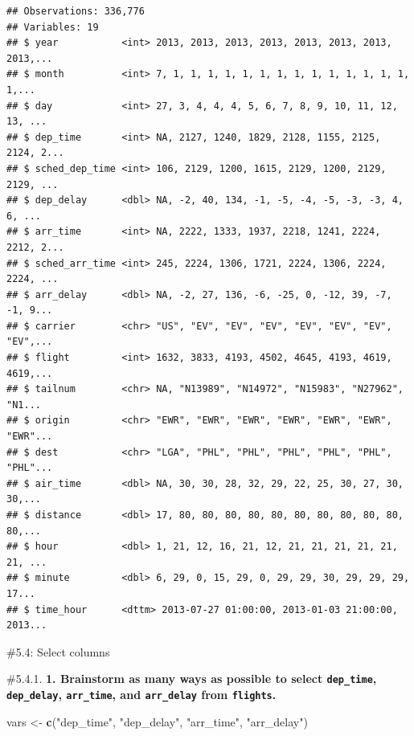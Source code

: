\documentclass[]{book}
\newenvironment{Shaded}{\begin{snugshade}}{\end{snugshade}}
\newcommand{\KeywordTok}[1]{\textcolor[rgb]{0.13,0.29,0.53}{\textbf{#1}}}
\newcommand{\NormalTok}[1]{#1}
\newcommand{\StringTok}[1]{\textcolor[rgb]{0.31,0.60,0.02}{#1}}
\theoremstyle{definition}
\theoremstyle{definition}
\theoremstyle{definition}
\theoremstyle{remark}
\begin{document}
\begin{verbatim}
## Observations: 336,776
## Variables: 19
## $ year           <int> 2013, 2013, 2013, 2013, 2013, 2013, 2013, 2013,...
## $ month          <int> 7, 1, 1, 1, 1, 1, 1, 1, 1, 1, 1, 1, 1, 1, 1, 1,...
## $ day            <int> 27, 3, 4, 4, 4, 5, 6, 7, 8, 9, 10, 11, 12, 13, ...
## $ dep_time       <int> NA, 2127, 1240, 1829, 2128, 1155, 2125, 2124, 2...
## $ sched_dep_time <int> 106, 2129, 1200, 1615, 2129, 1200, 2129, 2129, ...
## $ dep_delay      <dbl> NA, -2, 40, 134, -1, -5, -4, -5, -3, -3, 4, 6, ...
## $ arr_time       <int> NA, 2222, 1333, 1937, 2218, 1241, 2224, 2212, 2...
## $ sched_arr_time <int> 245, 2224, 1306, 1721, 2224, 1306, 2224, 2224, ...
## $ arr_delay      <dbl> NA, -2, 27, 136, -6, -25, 0, -12, 39, -7, -1, 9...
## $ carrier        <chr> "US", "EV", "EV", "EV", "EV", "EV", "EV", "EV",...
## $ flight         <int> 1632, 3833, 4193, 4502, 4645, 4193, 4619, 4619,...
## $ tailnum        <chr> NA, "N13989", "N14972", "N15983", "N27962", "N1...
## $ origin         <chr> "EWR", "EWR", "EWR", "EWR", "EWR", "EWR", "EWR"...
## $ dest           <chr> "LGA", "PHL", "PHL", "PHL", "PHL", "PHL", "PHL"...
## $ air_time       <dbl> NA, 30, 30, 28, 32, 29, 22, 25, 30, 27, 30, 30,...
## $ distance       <dbl> 17, 80, 80, 80, 80, 80, 80, 80, 80, 80, 80, 80,...
## $ hour           <dbl> 1, 21, 12, 16, 21, 12, 21, 21, 21, 21, 21, 21, ...
## $ minute         <dbl> 6, 29, 0, 15, 29, 0, 29, 29, 30, 29, 29, 29, 17...
## $ time_hour      <dttm> 2013-07-27 01:00:00, 2013-01-03 21:00:00, 2013...
\end{verbatim}

\#5.4: Select columns

\#5.4.1. \textbf{1. Brainstorm as many ways as possible to select
\texttt{dep\_time}, \texttt{dep\_delay}, \texttt{arr\_time}, and
\texttt{arr\_delay} from \texttt{flights}.}

\begin{Shaded}
\begin{Highlighting}[]
\NormalTok{vars <-}\StringTok{ }\KeywordTok{c}\NormalTok{(}\StringTok{"dep_time"}\NormalTok{, }\StringTok{"dep_delay"}\NormalTok{, }\StringTok{"arr_time"}\NormalTok{, }\StringTok{"arr_delay"}\NormalTok{)}
\end{Highlighting}
\end{Shaded}
\end{document}
